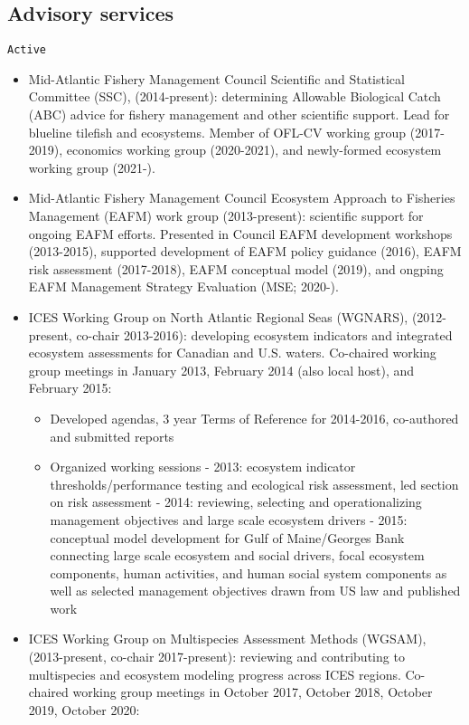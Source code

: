 \documentclass[11pt, a4paper]{awesome-cv}
\providecommand{\tightlist}{%
	\setlength{\itemsep}{0pt}\setlength{\parskip}{0pt}}
\begin{document}
\hypertarget{advisory-services}{%
\subsection{Advisory services}\label{advisory-services}}

\begin{verbatim}
Active
\end{verbatim}

\begin{itemize}
\item
  Mid-Atlantic Fishery Management Council Scientific and Statistical
  Committee (SSC), (2014-present): determining Allowable Biological
  Catch (ABC) advice for fishery management and other scientific
  support. Lead for blueline tilefish and ecosystems. Member of OFL-CV
  working group (2017-2019), economics working group (2020-2021), and
  newly-formed ecosystem working group (2021-).
\item
  Mid-Atlantic Fishery Management Council Ecosystem Approach to
  Fisheries Management (EAFM) work group (2013-present): scientific
  support for ongoing EAFM efforts. Presented in Council EAFM
  development workshops (2013-2015), supported development of EAFM
  policy guidance (2016), EAFM risk assessment (2017-2018), EAFM
  conceptual model (2019), and ongping EAFM Management Strategy
  Evaluation (MSE; 2020-).
\item
  ICES Working Group on North Atlantic Regional Seas (WGNARS),
  (2012-present, co-chair 2013-2016): developing ecosystem indicators
  and integrated ecosystem assessments for Canadian and U.S. waters.
  Co-chaired working group meetings in January 2013, February 2014 (also
  local host), and February 2015:

  \begin{itemize}
  \tightlist
  \item
    Developed agendas, 3 year Terms of Reference for 2014-2016,
    co-authored and submitted reports
  \item
    Organized working sessions - 2013: ecosystem indicator
    thresholds/performance testing and ecological risk assessment, led
    section on risk assessment - 2014: reviewing, selecting and
    operationalizing management objectives and large scale ecosystem
    drivers - 2015: conceptual model development for Gulf of
    Maine/Georges Bank connecting large scale ecosystem and social
    drivers, focal ecosystem components, human activities, and human
    social system components as well as selected management objectives
    drawn from US law and published work
  \end{itemize}
\item
  ICES Working Group on Multispecies Assessment Methods (WGSAM),
  (2013-present, co-chair 2017-present): reviewing and contributing to
  multispecies and ecosystem modeling progress across ICES regions.
  Co-chaired working group meetings in October 2017, October 2018,
  October 2019, October 2020:


\end{itemize}
\end{document}
